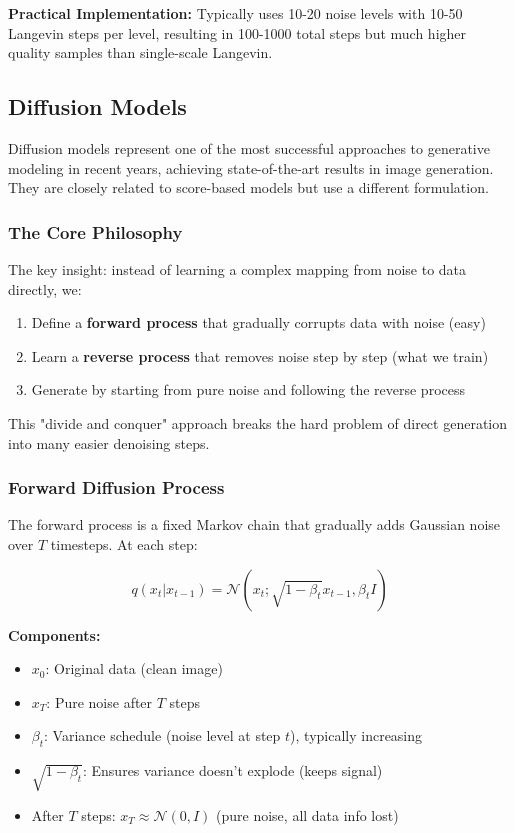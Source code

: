 \documentclass[journal]{IEEEtran}
\begin{document}
\textbf{Practical Implementation:} Typically uses 10-20 noise levels with 10-50 Langevin steps per level, resulting in 100-1000 total steps but much higher quality samples than single-scale Langevin.

\subsection{Diffusion Models}

Diffusion models represent one of the most successful approaches to generative modeling in recent years, achieving state-of-the-art results in image generation. They are closely related to score-based models but use a different formulation.

\subsubsection{The Core Philosophy}

The key insight: instead of learning a complex mapping from noise to data directly, we:
\begin{enumerate}
    \item Define a \textbf{forward process} that gradually corrupts data with noise (easy)
    \item Learn a \textbf{reverse process} that removes noise step by step (what we train)
    \item Generate by starting from pure noise and following the reverse process
\end{enumerate}

This "divide and conquer" approach breaks the hard problem of direct generation into many easier denoising steps.

\subsubsection{Forward Diffusion Process}

The forward process is a fixed Markov chain that gradually adds Gaussian noise over $T$ timesteps. At each step:

\begin{equation}
q(x_t | x_{t-1}) = \mathcal{N}(x_t; \sqrt{1-\beta_t}x_{t-1}, \beta_t I)
\end{equation}

\textbf{Components:}
\begin{itemize}
    \item $x_0$: Original data (clean image)
    \item $x_T$: Pure noise after $T$ steps
    \item $\beta_t$: Variance schedule (noise level at step $t$), typically increasing
    \item $\sqrt{1-\beta_t}$: Ensures variance doesn't explode (keeps signal)
    \item After $T$ steps: $x_T \approx \mathcal{N}(0, I)$ (pure noise, all data info lost)
\end{itemize}
\end{document}
